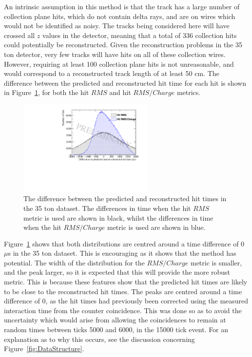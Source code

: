 An intrinsic assumption in this method is that the track has a large number of collection plane hits, which do not contain delta rays, and are on wires which would not be identified as noisy. The tracks being considered here will have crossed all $z$ values in the detector, meaning that a total of 336 collection hits could potentially be reconstructed. Given the reconstruction problems in the 35 ton detector, very few tracks will have hits on all of these collection wires. However, requiring at least 100 collection plane hits is not unreasonable, and would correspond to a reconstructed track length of at least 50 cm. The difference between the predicted and reconstructed hit time for each hit is shown in Figure~\ref{fig:DiffDataPredHit}, for both the hit $RMS$ and hit $RMS/Charge$ metrics. \\

\begin{figure}
  \centering
  \includegraphics[width=0.6\textwidth]{DifferenceInteractionTime_Data}
  \caption[The difference between the predicted and reconstructed hit times in the 35 ton dataset]
          {The difference between the predicted and reconstructed hit times in the 35 ton dataset. The differences in time when the hit $RMS$ metric is used are shown in black, whilst the differences in time when the hit $RMS/Charge$ metric is used are shown in blue.}
  \label{fig:DiffDataPredHit}
\end{figure}

Figure~\ref{fig:DiffDataPredHit} shows that both distributions are centred around a time difference of 0 $\mu$s in the 35 ton dataset. This is encouraging as it shows that the method has potential. The width of the distribution for the $RMS/Charge$ metric is smaller, and the peak larger, so it is expected that this will provide the more robust metric. This is because these features show that the predicted hit times are likely to be close to the reconstructed hit times. The peaks are centred around a time difference of 0, as the hit times had previously been corrected using the measured interaction time from the counter coincidence. This was done so as to avoid the uncertainty which would arise from allowing the coincidences to remain at random times between ticks 5000 and 6000, in the 15000 tick event. For an explanation as to why this occurs, see the discussion concerning Figure~\ref{fig:DataStructure}. \\

